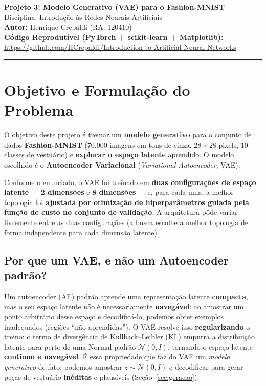 \documentclass[11pt,a4paper]{article}
\begin{document}
\begin{center}
    {\LARGE \textbf{Projeto 3: Modelo Generativo (VAE) para o Fashion-MNIST}} \\[0.35em]
    {\large Disciplina: Introdução às Redes Neurais Artificiais} \\[0.3em]
    \textbf{Autor:} Henrique Crepaldi (RA: 120410) \\[0.2em]
    \textbf{Código Reprodutível (PyTorch + scikit-learn + Matplotlib):} \url{https://github.com/HCrepaldi/Introduction-to-Artificial-Neural-Networks}
\end{center}
\vspace{-0.5em}
\hrule
\vspace{0.8em}

\section{Objetivo e Formulação do Problema}

O objetivo deste projeto é treinar um \textbf{modelo generativo} para o conjunto de dados \textbf{Fashion-MNIST} (70.000 imagens em tons de cinza, $28 \times 28$ pixels, 10 classes de vestuário) e \textbf{explorar o espaço latente} aprendido. O modelo escolhido é o \textbf{Autoencoder Variacional} (\textit{Variational Autoencoder}, VAE).

Conforme o enunciado, o VAE foi treinado em \textbf{duas configurações de espaço latente} --- \textbf{2 dimensões} e \textbf{8 dimensões} --- e, para cada uma, a melhor topologia foi \textbf{ajustada por otimização de hiperparâmetros guiada pela função de custo no conjunto de validação}. A arquitetura pôde variar livremente entre as duas configurações (a busca escolhe a melhor topologia de forma independente para cada dimensão latente).

\subsection{Por que um VAE, e não um Autoencoder padrão?}
Um autoencoder (AE) padrão aprende uma representação latente \textbf{compacta}, mas o seu espaço latente não é necessariamente \textbf{navegável}: ao amostrar um ponto arbitrário desse espaço e decodificá-lo, podemos obter exemplos inadequados (regiões ``não aprendidas''). O VAE resolve isso \textbf{regularizando} o treino: o termo de divergência de Kullback--Leibler (KL) empurra a distribuição latente para perto de uma Normal padrão $\mathcal{N}(0, I)$, tornando o espaço latente \textbf{contínuo e navegável}. É essa propriedade que faz do VAE um \textit{modelo generativo} de fato: podemos amostrar $z \sim \mathcal{N}(0, I)$ e decodificar para gerar peças de vestuário \textbf{inéditas} e plausíveis (Seção~\ref{sec:geracao}).
\end{document}
